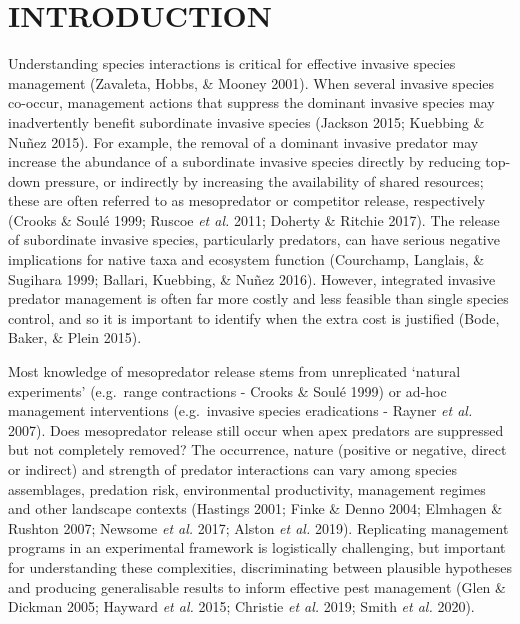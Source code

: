 \documentclass[]{elsarticle} %
\begin{document}
\newpage

\hypertarget{introduction}{%
\section{INTRODUCTION}\label{introduction}}

Understanding species interactions is critical for effective invasive species management (Zavaleta, Hobbs, \& Mooney 2001). When several invasive species co-occur, management actions that suppress the dominant invasive species may inadvertently benefit subordinate invasive species (Jackson 2015; Kuebbing \& Nuñez 2015). For example, the removal of a dominant invasive predator may increase the abundance of a subordinate invasive species directly by reducing top-down pressure, or indirectly by increasing the availability of shared resources; these are often referred to as mesopredator or competitor release, respectively (Crooks \& Soulé 1999; Ruscoe \emph{et al.} 2011; Doherty \& Ritchie 2017). The release of subordinate invasive species, particularly predators, can have serious negative implications for native taxa and ecosystem function (Courchamp, Langlais, \& Sugihara 1999; Ballari, Kuebbing, \& Nuñez 2016). However, integrated invasive predator management is often far more costly and less feasible than single species control, and so it is important to identify when the extra cost is justified (Bode, Baker, \& Plein 2015).

Most knowledge of mesopredator release stems from unreplicated `natural experiments' (e.g.~range contractions - Crooks \& Soulé 1999) or ad-hoc management interventions (e.g.~invasive species eradications - Rayner \emph{et al.} 2007). Does mesopredator release still occur when apex predators are suppressed but not completely removed? The occurrence, nature (positive or negative, direct or indirect) and strength of predator interactions can vary among species assemblages, predation risk, environmental productivity, management regimes and other landscape contexts (Hastings 2001; Finke \& Denno 2004; Elmhagen \& Rushton 2007; Newsome \emph{et al.} 2017; Alston \emph{et al.} 2019). Replicating management programs in an experimental framework is logistically challenging, but important for understanding these complexities, discriminating between plausible hypotheses and producing generalisable results to inform effective pest management (Glen \& Dickman 2005; Hayward \emph{et al.} 2015; Christie \emph{et al.} 2019; Smith \emph{et al.} 2020).
\end{document}
